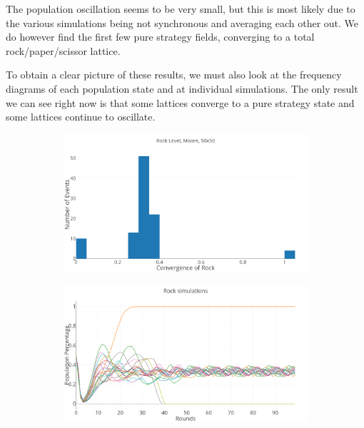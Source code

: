 \documentclass[a4paper, 11pt]{article}
\begin{document}
\begin{landscape}
The population oscillation seems to be very small, but this is most likely due to the various simulations being not synchronous and averaging each other out. We do however find the first few pure strategy fields, converging to a total rock/paper/scissor lattice.

To obtain a clear picture of these results, we must also look at the frequency diagrams of each population state and at individual simulations. The only result we can see right now is that some lattices converge to a pure strategy state and some lattices continue to oscillate.

\end{landscape}

\newpage

\begin{figure}[H]
	\begin{subfigure}{0.52\textwidth}
		\includegraphics[width=1\linewidth]{50x50_50RockDist_RockHG}
	\end{subfigure}%
	\begin{subfigure}{0.52\textwidth}
		\includegraphics[width=1\linewidth]{50x50_50RockDist_IndividualRock}
	\end{subfigure}
	

\end{figure}
\end{document}

